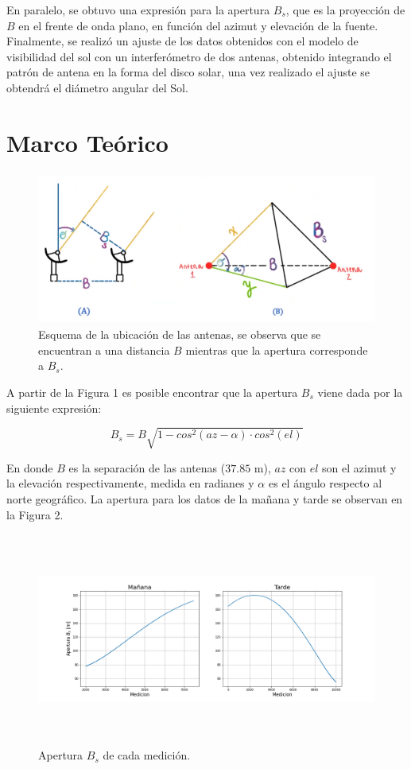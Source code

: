 \documentclass[letterpaper,oneside]{article}
\begin{document}
En paralelo, se obtuvo una expresión para la apertura $B_s$, que es la proyección de $B$ en el frente de onda plano, en función del azimut y elevación de la fuente.\\

Finalmente, se realizó un ajuste de los datos obtenidos con el modelo de visibilidad del sol con un interferómetro de dos antenas, obtenido integrando el patrón de antena en la forma del disco solar, una vez realizado el ajuste se obtendrá el diámetro angular del Sol.

\section{Marco Teórico}
\begin{figure}
  \centering
  \includegraphics[height=5cm]{../graficos/interferometro.png}
  \caption{Esquema de la ubicación de las antenas, se observa que se encuentran a una distancia $B$ mientras que la apertura corresponde a $B_s$.}
\end{figure}

A partir de la Figura 1 es posible encontrar que la apertura $B_s$ viene dada por la siguiente expresión:

\begin{equation}
    B_s = B\sqrt{1-cos^2(az-\alpha)\cdot cos^2(el)}
\end{equation}

En donde $B$ es la separación de las antenas ($37.85$ m), $az$ con $el$ son el azimut y la elevación respectivamente, medida en radianes y $\alpha$ es el ángulo respecto al norte geográfico. La apertura para los datos de la mañana y tarde se observan en la Figura 2.\\

\begin{figure}
  \centering
  \includegraphics[height=7cm]{../graficos/aperturas.png}
  \caption{Apertura $B_s$ de cada medición.}
\end{figure}
\end{document}
